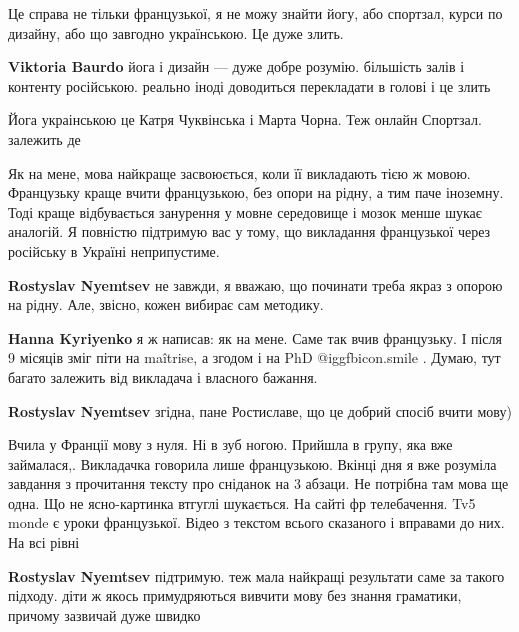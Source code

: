 \begin{itemize}
Це справа не тільки французької, я не можу знайти йогу, або спортзал, курси по
дизайну, або що завгодно українською. Це дуже злить.

\begin{itemize} %
\textbf{Viktoria Baurdo} йога і дизайн — дуже добре розумію. більшість залів і контенту російською. реально іноді доводиться перекладати в голові і це злить

Йога украінською це Катря Чуквінська і Марта Чорна. Теж онлайн
Спортзал. залежить де
\end{itemize} %


Як на мене, мова найкраще засвоюється, коли її викладають тією ж мовою.
Французьку краще вчити французькою, без опори на рідну, а тим паче іноземну.
Тоді краще відбувається занурення у мовне середовище і мозок менше шукає
аналогій. Я повністю підтримую вас у тому, що викладання французької через
російську в Україні неприпустиме.

\begin{itemize} %
\textbf{Rostyslav Nyemtsev} не завжди, я вважаю, що починати треба якраз з опорою на рідну. Але, звісно, кожен вибирає сам методику.

\textbf{Hanna Kyriyenko} я ж написав: як на мене. Саме так вчив французьку. І після 9 місяців зміг піти на maîtrise, а згодом і на PhD  @igg{fbicon.smile} . Думаю, тут багато залежить від викладача і власного бажання.

\textbf{Rostyslav Nyemtsev} згідна, пане Ростиславе, що це добрий спосіб вчити мову)

Вчила у Франції мову з нуля. Ні в зуб ногою. Прийшла в групу, яка вже займалася,. Викладачка говорила лише французькою. Вкінці дня я вже розуміла завдання з прочитання тексту про сніданок на 3 абзаци. Не потрібна там мова ще одна. Що не ясно-картинка втгуглі шукається.
На сайті фр телебачення. Tv5 monde є уроки французької. Відео з текстом всього сказаного і вправами до них. На всі рівні

\textbf{Rostyslav Nyemtsev} підтримую. теж мала найкращі результати саме за такого підходу. діти ж якось примудряються вивчити мову без знання граматики, причому зазвичай дуже швидко
\end{itemize} %



\end{itemize}
